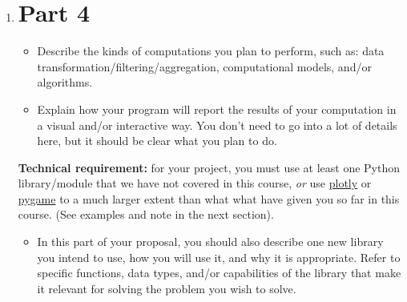 \documentclass[12pt]{article}
\newenvironment{solution}
  {\renewcommand\qedsymbol{$\blacksquare$}
  \begin{proof}[Solution]}
  {\end{proof}}
\renewcommand\qedsymbol{$\blacksquare$}
\begin{document}
\begin{enumerate}
\begin{itemize}
    \item State the source (e.g., government/organization website) and format (e.g., text, csv, json, image) of the dataset, and give some sample data contained inside that dataset.
    \item Don’t be afraid to cobble together your own dataset, such as creating a collection of images that are related. Or to combine two datasets from different sources.
    \item You will also submit a small sample of your dataset to MarkUs along with your project proposal document. (See more below)
\end{itemize}

\begin{solution}

\end{solution}

\newpage

\item \section*{Part 4}

\begin{itemize}
    \item Describe the kinds of computations you plan to perform, such as: data transformation/filtering/aggregation, computational models, and/or algorithms.
    \item Explain how your program will report the results of your computation in a visual and/or interactive way. You don’t need to go into a lot of details here, but it should be clear what you plan to do.
\end{itemize}

\textbf{Technical requirement:} for your project, you must use at least one Python library/module that we have not covered in this course, \emph{or} use \underline{plotly} or \underline{pygame} to a much larger extent than what what have given you so far in this course. (See examples and note in the next section).

\begin{itemize}
    \item In this part of your proposal, you should also describe one new library you intend to use, how you will use it, and why it is appropriate. Refer to specific functions, data types, and/or capabilities of the library that make it relevant for solving the problem you wish to solve.
\end{itemize}


\end{enumerate}
\end{document}

